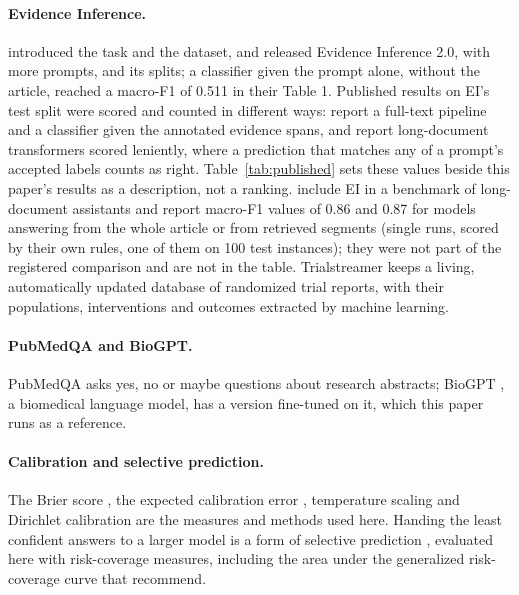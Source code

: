 \documentclass[11pt,letterpaper]{article}
\begin{document}
\paragraph{Evidence Inference.} \citet{lehman2019} introduced the task and the dataset, and \citet{deyoung2020} released Evidence Inference 2.0, with more prompts, and its splits; a classifier given the prompt alone, without the article, reached a macro-F1 of 0.511 in their Table 1. Published results on EI's test split were scored and counted in different ways: \citet{deyoung2020} report a full-text pipeline and a classifier given the annotated evidence spans, and \citet{buchmann2024structure} report long-document transformers scored leniently, where a prediction that matches any of a prompt's accepted labels counts as right. Table~\ref{tab:published} sets these values beside this paper's results as a description, not a ranking. \citet{buchmann2024lab} include EI in a benchmark of long-document assistants and report macro-F1 values of 0.86 and 0.87 for models answering from the whole article or from retrieved segments (single runs, scored by their own rules, one of them on 100 test instances); they were not part of the registered comparison and are not in the table. Trialstreamer \citep{marshall2020} keeps a living, automatically updated database of randomized trial reports, with their populations, interventions and outcomes extracted by machine learning.

\paragraph{PubMedQA and BioGPT.} PubMedQA \citep{jin2019} asks yes, no or maybe questions about research abstracts; BioGPT \citep{luo2022}, a biomedical language model, has a version fine-tuned on it, which this paper runs as a reference.

\paragraph{Calibration and selective prediction.} The Brier score \citep{brier1950}, the expected calibration error \citep{naeini2015}, temperature scaling \citep{guo2017} and Dirichlet calibration \citep{kull2019} are the measures and methods used here. Handing the least confident answers to a larger model is a form of selective prediction \citep{geifman2017}, evaluated here with risk-coverage measures, including the area under the generalized risk-coverage curve that \citet{traub2024} recommend.
\end{document}
